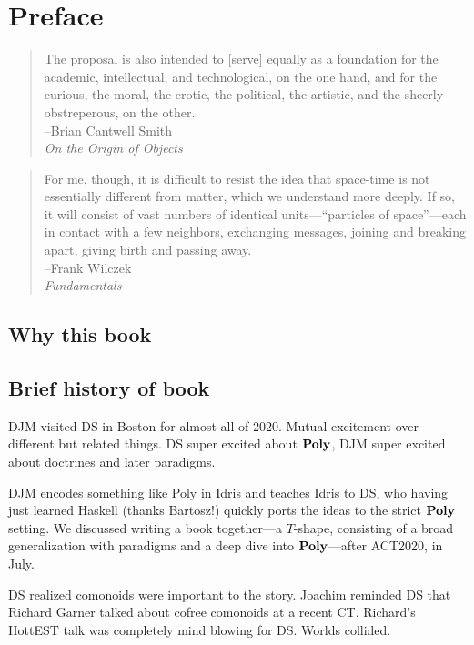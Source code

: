 \documentclass[Book-Poly]{subfiles}
\begin{document}
\chapter*{Preface}\label{chapter.0}

\begin{quote}
	The proposal is also intended to [serve] equally as a foundation for the academic, intellectual, and technological, on the one hand, and for the curious, the moral, the erotic, the political, the artistic, and the sheerly obstreperous, on the other.\\
\mbox{}\hfill --Brian Cantwell Smith\\
\mbox{}\hfill \emph{On the Origin of Objects}
\end{quote}

\begin{quote}
For me, though, it is difficult to resist the idea that space-time is not essentially different from matter, which we understand more deeply. If so, it will consist of vast numbers of identical units---``particles of space''---each in contact with a few neighbors, exchanging messages, joining and breaking apart, giving birth and passing away.\\
\mbox{}\hfill --Frank Wilczek\\
\mbox{}\hfill \emph{Fundamentals}
\end{quote}

\section*{Why this book}

\section*{Brief history of book}

DJM visited DS in Boston for almost all of 2020. Mutual excitement over different but related things. DS super excited about $\mathbf{Poly}$, DJM super excited about doctrines and later paradigms.

DJM encodes something like Poly in Idris and teaches Idris to DS, who having just learned Haskell (thanks Bartosz!) quickly ports the ideas to the strict $\mathbf{Poly}$ setting. We discussed writing a book together---a $T$-shape, consisting of a broad generalization with paradigms and a deep dive into $\mathbf{Poly}$---after ACT2020, in July.

DS realized comonoids were important to the story. Joachim reminded DS that Richard Garner talked about cofree comonoids at a recent CT. Richard's HottEST talk was completely mind blowing for DS. Worlds collided.
\end{document}

